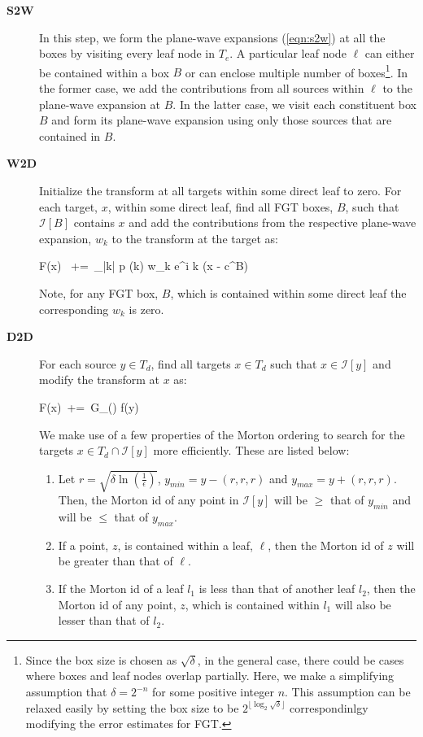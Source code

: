 \begin{description}
\item[\textbf{S2W}] In this step, we form the plane-wave expansions (\ref{eqn:s2w}) at all the boxes by visiting 
every leaf node in $T_e$. A particular leaf node $\ell$ can either be contained within a box $B$ or can enclose multiple number of boxes\footnote{Since the box size is chosen as $\sqrt{\delta}$, in the general case, there could be cases where boxes and leaf nodes overlap partially. Here, we make a simplifying assumption that $\delta = 2^{-n}$ for some positive 
integer $n$. This assumption can be relaxed easily by setting the box size to be $2^{\lfloor \log_2 \sqrt{\delta} \rfloor}$ correspondinlgy modifying the error estimates for FGT.}. In the former case, we add the contributions from all sources
within $\ell$ to the plane-wave expansion at $B$. In the latter case, we visit each constituent box $B$ and form 
its plane-wave expansion using only those sources that are contained in $B$.

\item[\textbf{W2D}] Initialize the transform at all targets within some direct leaf to zero. For
 each target, $x$, within some direct leaf, find all FGT boxes, $B$, such that $\mathcal{I}[B]$ contains $x$ and
 add the contributions from the respective plane-wave expansion, $w_k$ to the transform at the target as: 

\beq F(x) \, +=\, \sum_{|k| \leq p} (k)  w_k e^{i \lambda k \cdot (x - c^B)} \label{eqn:w2d} \eeq

Note, for any FGT box, $B$, which is contained within some direct leaf the corresponding $w_k$ is zero.

\item[\textbf{D2D}] For each source $y \in T_d$, find all targets $x \in T_d$ such that $x \in \mathcal{I}[y]$ and
 modify the transform at $x$ as:
  
\beq F(x) \,+=\, G_\delta() f(y) \label{eqn:d2d} \eeq

We make use of a few properties of the Morton ordering to search for the targets $x \in T_d \cap \mathcal{I}[y]$ more efficiently. These
are listed below:
\begin{enumerate}
\item Let $r = \sqrt{\delta \ln (\frac{1}{\epsilon})}$, $y_{min} = y - (r, r, r)$ and $y_{max} = y + (r, r, r)$. Then, the Morton id of
any point in $\mathcal{I}[y]$ will be $\geq$ that of $y_{min}$ and will be $\leq$ that of $y_{max}$.
\item If a point, $z$, is contained within a leaf, $\ell$, then the Morton id of $z$ will be greater than that of $\ell$.
\item If the Morton id of a leaf $l_1$ is less than that of another leaf $l_2$, then the Morton id of any point, $z$, which is
 contained within $l_1$ will also be lesser than that of $l_2$.
\end{enumerate}


\end{description}
